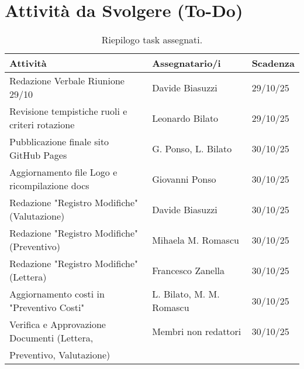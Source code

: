 \documentclass[a4paper, 11pt, oneside]{scrartcl} %
\begin{document}
\newpage
\section{Attività da Svolgere (To-Do)}

\begin{table}[h!]
\centering
\begin{tabular}{@{}lll@{}}
\toprule
\textbf{Attività} & \textbf{Assegnatario/i} & \textbf{Scadenza} \\
\midrule
Redazione Verbale Riunione 29/10 & Davide Biasuzzi & 29/10/25 \\
Revisione tempistiche ruoli e criteri rotazione & Leonardo Bilato & 29/10/25 \\
Pubblicazione finale sito GitHub Pages & G. Ponso, L. Bilato & 30/10/25 \\
Aggiornamento file Logo e ricompilazione docs & Giovanni Ponso & 30/10/25 \\
Redazione "Registro Modifiche" (Valutazione) & Davide Biasuzzi & 30/10/25 \\
Redazione "Registro Modifiche" (Preventivo) & Mihaela M. Romascu & 30/10/25 \\
Redazione "Registro Modifiche" (Lettera) & Francesco Zanella & 30/10/25 \\
Aggiornamento costi in "Preventivo Costi" & L. Bilato, M. M. Romascu & 30/10/25 \\
Verifica e Approvazione Documenti (Lettera, & Membri non redattori & 30/10/25 \\
Preventivo, Valutazione) & & \\
\bottomrule
\end{tabular}
\caption{Riepilogo task assegnati.}
\end{table}
\end{document}
